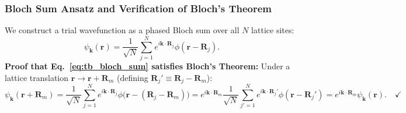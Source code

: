 \documentclass[11pt,a4paper]{article}
\newcommand{\kk}{\mathbf{k}}
\newcommand{\RR}{\mathbf{R}}
\newcommand{\rvec}{\mathbf{r}}
\begin{document}
\subsubsection{Bloch Sum Ansatz and Verification of Bloch's Theorem}
We construct a trial wavefunction as a phased Bloch sum over all $N$ lattice sites:
\begin{equation}
    \psi_{\kk}(\rvec) = \frac{1}{\sqrt{N}}\sum_{j=1}^N e^{i\kk\cdot\RR_j}\phi(\rvec - \RR_j).
    \label{eq:tb_bloch_sum}
\end{equation}
\textbf{Proof that Eq.~\eqref{eq:tb_bloch_sum} satisfies Bloch's Theorem:} Under a lattice translation $\rvec \to \rvec + \RR_m$ (defining $\RR_j' \equiv \RR_j - \RR_m$):
\begin{equation}
    \psi_{\kk}(\rvec + \RR_m) = \frac{1}{\sqrt{N}}\sum_{j=1}^N e^{i\kk\cdot\RR_j}\phi\big(\rvec - (\RR_j - \RR_m)\big) = e^{i\kk\cdot\RR_m}\frac{1}{\sqrt{N}}\sum_{j'=1}^N e^{i\kk\cdot\RR_j'}\phi(\rvec - \RR_j') = e^{i\kk\cdot\RR_m}\psi_{\kk}(\rvec). \quad \checkmark
\end{equation}
\end{document}
